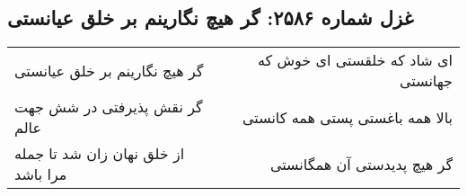 \begin{center}
\section*{غزل شماره ۲۵۸۶: گر هیچ نگارینم بر خلق عیانستی}
\label{sec:2586}
\begin{longtable}{l p{0.5cm} r}
گر هیچ نگارینم بر خلق عیانستی
&&
ای شاد که خلقستی ای خوش که جهانستی
\\
گر نقش پذیرفتی در شش جهت عالم
&&
بالا همه باغستی پستی همه کانستی
\\
از خلق نهان زان شد تا جمله مرا باشد
&&
گر هیچ پدیدستی آن همگانستی
\\
\end{longtable}
\end{center}
